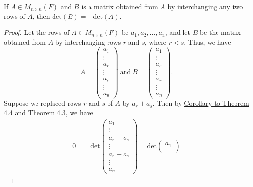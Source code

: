 \begin{theorem}
    If \( A \in {M}_{n \times n}(F) \) and \( B  \) is a matrix obtained from \( A  \) by interchanging any two rows of \( A  \), then \( \text{det}(B) = -\text{det}(A) \).
\end{theorem}
\begin{proof}
Let the rows of \( A \in {M}_{n \times n}(F) \) be \( {a}_{1}, {a}_{2}, \dots, {a}_{n} \), and let \( B  \) be the matrix obtained from \( A  \) by interchanging rows \( r  \) and \( s  \), where \( r < s  \). Thus, we have
\[  A = \begin{pmatrix} 
           {a}_{1} \\
           \vdots \\
           {a}_{r} \\
           \vdots \\
           {a}_{s} \\
           \vdots \\
           {a}_{n}
       \end{pmatrix} \ \text{and} \ B = \begin{pmatrix} 
                 {a}_{1} \\ 
                 \vdots \\
                 {a}_{s} \\
                 \vdots \\
                 {a}_{r} \\
                 \vdots \\
                 {a}_{n}
                 \end{pmatrix}. \]
Suppose we replaced rows \( r  \) and \( s  \) of \( A  \) by \( {a}_{r} + {a}_{s} \). Then by {\hyperref[Corollary to Theorem 4.4]{Corollary to Theorem 4.4}} and {\hyperref[Theorem 4.3]{Theorem 4.3}}, we have
\begin{align*}
    0 &= \text{det} \begin{pmatrix} 
               {a}_{1} \\
               \vdots \\
               {a}_{r} + {a}_{s} \\
               \vdots \\
               {a}_{r} + {a}_{s} \\
               \vdots \\
               {a}_{n}
              \end{pmatrix} 
              = \text{det} \begin{pmatrix} 
                         {a}_{1} \\

\end{pmatrix}
\end{align*}
\end{proof}
